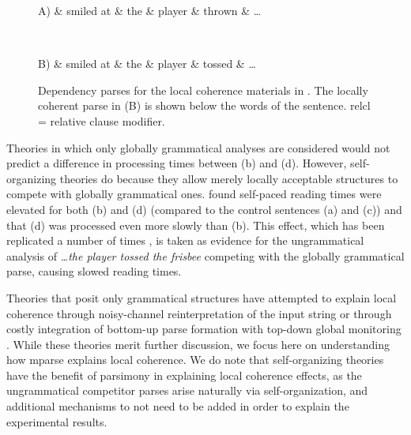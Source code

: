 \documentclass[a4paper, 12pt]{article}
\begin{document}
\begin{figure}[htbp]
\begin{dependency}[theme=simple, font=\normalsize, label style={font=\normalsize}]
\begin{deptext}[column sep=1em]
    A) \& smiled at \& the \& player \& thrown \& \dots\\
\end{deptext}
\end{dependency}
\\
\begin{dependency}[theme=simple, font=\normalsize, label style={font=\normalsize}]
\begin{deptext}[column sep=1em]
    B) \& smiled at \& the \& player \& tossed \& \dots\\
\end{deptext}
\end{dependency}
\caption{Dependency parses for the local coherence materials in \protect\Last.
    The locally coherent parse in (B) is shown below the words of the sentence.
    relcl = relative clause modifier.}\label{fig:gpresolve}
\end{figure}

Theories in which only globally grammatical analyses are considered would not
predict a difference in processing times between \Last (b) and (d). However,
self-organizing theories do because they allow merely locally acceptable
structures to compete with globally grammatical ones.
\citet{tabor2004effects} found self-paced reading times were elevated for both
\Last (b) and (d) (compared to the control sentences (a) and (c)) and that (d)
was processed even more slowly than (b).  This effect, which  has been
replicated a number of times \citep{levy2009eye, mueller2019effect,
    konieczny2005psychological, konieczny2009local, paape2015local,
    kamide2018influence, christianson2017why}, is taken as evidence for the
ungrammatical analysis of \emph{\dots the player tossed the frisbee} competing
with the globally grammatical parse, causing slowed reading times.

Theories that posit only grammatical structures have attempted to explain local
coherence through noisy-channel reinterpretation of the input string
\citep{levy2008noisy, levy2009eye} or through costly integration of bottom-up
parse formation with top-down global monitoring \citep{bicknell2009model,
    gibson2006interaction, morgan2010bottom}.  While these theories merit
further discussion, we focus here on understanding how mparse explains local
coherence. We do note that self-organizing theories have the benefit of
parsimony in explaining local coherence effects, as the ungrammatical
competitor parses arise naturally via self-organization, and additional
mechanisms to not need to be added in order to explain the experimental
results.
\end{document}
